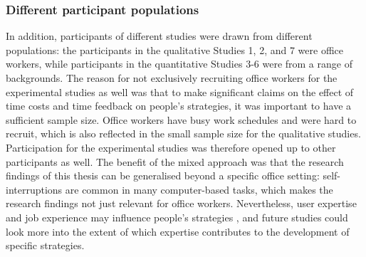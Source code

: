 \subsubsection{Different participant populations}
In addition, participants of different studies were drawn from different populations: the participants in the qualitative Studies 1, 2, and 7 were office workers, while participants in the quantitative Studies 3-6 were from a range of backgrounds. The reason for not exclusively recruiting office workers for the experimental studies as well was that to make significant claims on the effect of time costs and time feedback on people's strategies, it was important to have a sufficient sample size. Office workers have busy work schedules and were hard to recruit, which is also reflected in the small sample size for the qualitative studies. Participation for the experimental studies was therefore opened up to other participants as well. The benefit of the mixed approach was that the research findings of this thesis can be generalised beyond a specific office setting: self-interruptions are common in many computer-based tasks, which makes the research findings not just relevant for office workers. Nevertheless, user expertise and job experience may influence people's strategies \citep{Weir2007}, and future studies could look more into the extent of which expertise contributes to the development of specific strategies. 





